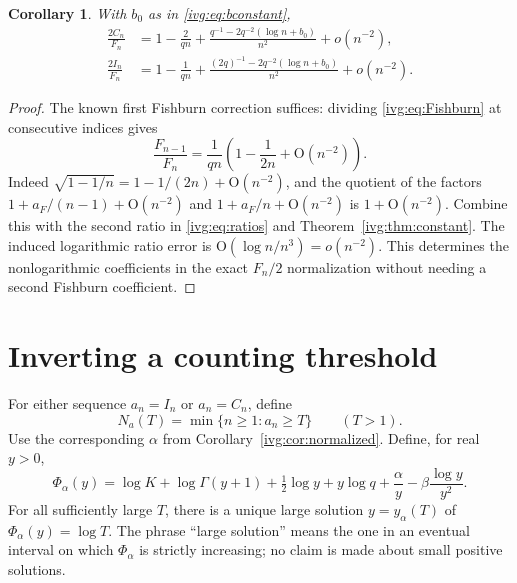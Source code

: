 \documentclass[11pt,letterpaper]{article}
\newtheorem{corollary}[theorem]{Corollary}
\theoremstyle{definition}\newtheorem{definition}[theorem]{Definition}
\theoremstyle{remark}\newtheorem{remark}[theorem]{Remark}
\newcommand{\OO}{\mathrm O}
\begin{document}
\begin{corollary}\label{ivg:cor:Frelativeconstant}
With $b_0$ as in \eqref{ivg:eq:bconstant},
\begin{align}
 \frac{2C_n}{F_n}&=1-\frac2{qn}
 +\frac{q^{-1}-2q^{-2}(\log n+b_0)}{n^2}+o(n^{-2}),\label{ivg:eq:Crelsharp}\\
 \frac{2I_n}{F_n}&=1-\frac1{qn}
 +\frac{(2q)^{-1}-2q^{-2}(\log n+b_0)}{n^2}+o(n^{-2}).\label{ivg:eq:Irelsharp}
\end{align}
\end{corollary}
\begin{proof}
The known first Fishburn correction suffices: dividing \eqref{ivg:eq:Fishburn} at consecutive indices gives
\[
 \frac{F_{n-1}}{F_n}=\frac1{qn}\left(1-\frac1{2n}+\OO(n^{-2})\right).
\]
Indeed $\sqrt{1-1/n}=1-1/(2n)+\OO(n^{-2})$, and the quotient of the factors $1+a_F/(n-1)+\OO(n^{-2})$ and $1+a_F/n+\OO(n^{-2})$ is $1+\OO(n^{-2})$. Combine this with the second ratio in \eqref{ivg:eq:ratios} and Theorem~\ref{ivg:thm:constant}. The induced logarithmic ratio error is $\OO(\log n/n^3)=o(n^{-2})$. This determines the nonlogarithmic coefficients in the exact $F_n/2$ normalization without needing a second Fishburn coefficient.
\end{proof}

\section{Inverting a counting threshold}\label{ivg:sec:inverse}
For either sequence $a_n=I_n$ or $a_n=C_n$, define
\[
 N_a(T)=\min\{n\ge1:a_n\ge T\}\qquad(T>1).
\]
Use the corresponding $\alpha$ from Corollary~\ref{ivg:cor:normalized}. Define, for real $y>0$,
\begin{equation}\label{ivg:eq:Phi}
 \Phi_\alpha(y)=\log K+\log\Gamma(y+1)+\tfrac12\log y
 +y\log q+\frac\alpha y-\beta\frac{\log y}{y^2}.
\end{equation}
For all sufficiently large $T$, there is a unique large solution $y=y_\alpha(T)$ of $\Phi_\alpha(y)=\log T$. The phrase ``large solution'' means the one in an eventual interval on which $\Phi_\alpha$ is strictly increasing; no claim is made about small positive solutions.
\end{document}
